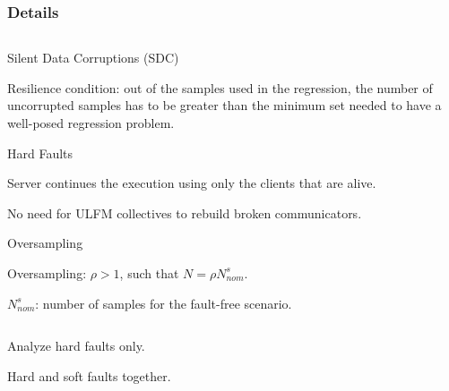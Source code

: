 \begin{frame}
\frametitle{Details}
%
\begin{columns}
\begin{column}{1.1\textwidth}
\begin{block}{Silent Data Corruptions (SDC)}
\bi
\item Resilience condition: out of the samples used in the regression, 
the number of uncorrupted samples has to be greater than 
the minimum set needed to have a well-posed 
regression problem. 
\ei
\end{block}
%
\begin{block}{Hard Faults}
\bi
\item Server continues the execution using 
only the clients that are alive.
\item No need for ULFM collectives to rebuild broken communicators.
\ei
\end{block}
\begin{block}{Oversampling}
\bi
\item Oversampling: $\rho >1$, such that $N = \rho N_{nom}^{s}$.
\item $N_{nom}^{s}$: number of samples for the fault-free scenario.
\ei
\end{block}

\end{column}
\end{columns}
%

\begin{columns}
\begin{column}{1.1\textwidth}
\bi
\item Analyze hard faults only.
\item Hard and soft faults together.
\ei
\end{column}
\end{columns}
%
\end{frame}






